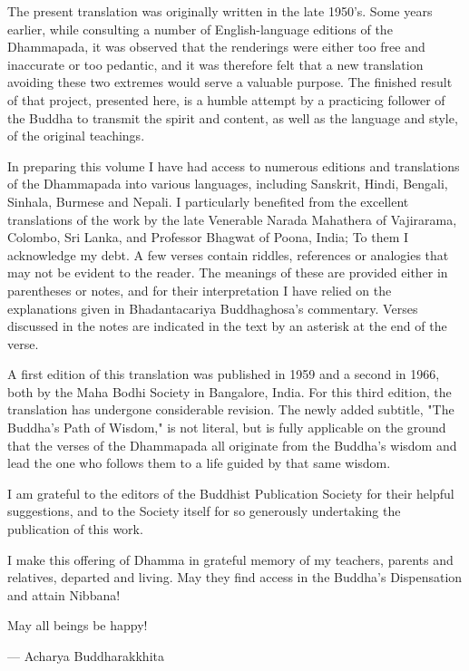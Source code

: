 The present translation was originally written in the late 1950's. Some years earlier, while consulting a number of English-language editions of the Dhammapada, it was observed that the renderings were either too free and inaccurate or too pedantic, and it was therefore felt that a new translation avoiding these two extremes would serve a valuable purpose. The finished result of that project, presented here, is a humble attempt by a practicing follower of the Buddha to transmit the spirit and content, as well as the language and style, of the original teachings.

In preparing this volume I have had access to numerous editions and translations of the Dhammapada into various languages, including Sanskrit, Hindi, Bengali, Sinhala, Burmese and Nepali. I particularly benefited from the excellent translations of the work by the late Venerable Narada Mahathera of Vajirarama, Colombo, Sri Lanka, and Professor Bhagwat of Poona, India; To them I acknowledge my debt. A few verses contain riddles, references or analogies that may not be evident to the reader. The meanings of these are provided either in parentheses or notes, and for their interpretation I have relied on the explanations given in Bhadantacariya Buddhaghosa's commentary. Verses discussed in the notes are indicated in the text by an asterisk at the end of the verse.

A first edition of this translation was published in 1959 and a second in 1966, both by the Maha Bodhi Society in Bangalore, India. For this third edition, the translation has undergone considerable revision. The newly added subtitle, "The Buddha's Path of Wisdom," is not literal, but is fully applicable on the ground that the verses of the Dhammapada all originate from the Buddha's wisdom and lead the one who follows them to a life guided by that same wisdom.

I am grateful to the editors of the Buddhist Publication Society for their helpful suggestions, and to the Society itself for so generously undertaking the publication of this work.

I make this offering of Dhamma in grateful memory of my teachers, parents and relatives, departed and living. May they find access in the Buddha's Dispensation and attain Nibbana!

May all beings be happy!

— Acharya Buddharakkhita
